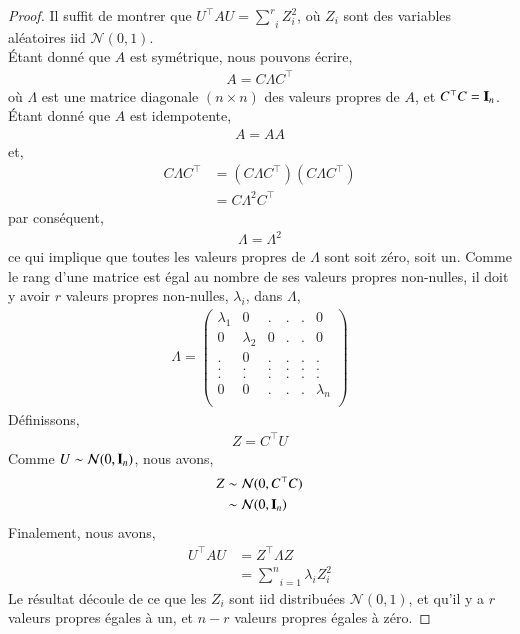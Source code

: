 \documentclass[10pt, reqno]{amsart}
\begin{document}
\begin{proof}
Il suffit de montrer que $U^\top A U = \underset{i}{\overset{r}{\sum}} Z_i^2$, où $Z_i$ sont des variables aléatoires iid $\mathcal{N}(0,1)$.\\
\'Etant donné que $A$ est symétrique, nous pouvons écrire,
\begin{align*}
A = C\Lambda C^\top
\end{align*}
où $\Lambda $ est une matrice diagonale $(n\times n)$ des valeurs propres de $A$, et $C^\top C=\mathbf{I}_n$. \'Etant donné que $A$ est idempotente,
\begin{align*}
A = AA
\end{align*}
et,
\begin{align*}
 C\Lambda C^\top &= ( C\Lambda C^\top)( C\Lambda C^\top)\\
 &=C\Lambda^2C^\top
\end{align*}
par conséquent,
\begin{align*}
\Lambda=\Lambda^2
\end{align*}
ce qui implique que toutes les valeurs propres de $\Lambda$ sont soit zéro, soit un. Comme le rang d'une matrice est égal au nombre de ses valeurs propres non-nulles, il doit y avoir $r$ valeurs propres non-nulles, $\lambda_i$, dans $\Lambda$,
\begin{align*}
\Lambda=
\left(
\begin{array}{cccccc}
\lambda_1&0&.&.&.&0\\
0&\lambda_2&0&.&.&0\\
.&0&.&.&.&.\\
.&.&.&.&.&.\\
.&.&.&.&.&.\\
0&0&.&.&.&\lambda_n\\
\end{array}
\right)
\end{align*}
Définissons,
\begin{align*}
Z = C^\top U
\end{align*}
Comme $U\sim\mathcal{N}(0, \mathbf{I}_n)$, nous avons,
\begin{align*}
Z &\sim  \mathcal{N}(0, C^\top C)\\
&\sim  \mathcal{N}(0, \mathbf{I}_n)
\end{align*}
Finalement, nous avons,
\begin{align*}
U^\top AU &= Z^\top\Lambda Z\\
&=\underset{i=1}{\overset{n}{\sum}} \lambda_iZ_i^2
\end{align*}
Le résultat découle de ce que les $Z_i$ sont iid distribuées $\mathcal{N}(0,1)$, et qu'il y a $r$ valeurs propres égales à un, et $n-r$ valeurs propres égales à zéro.
\end{proof}
\end{document}
